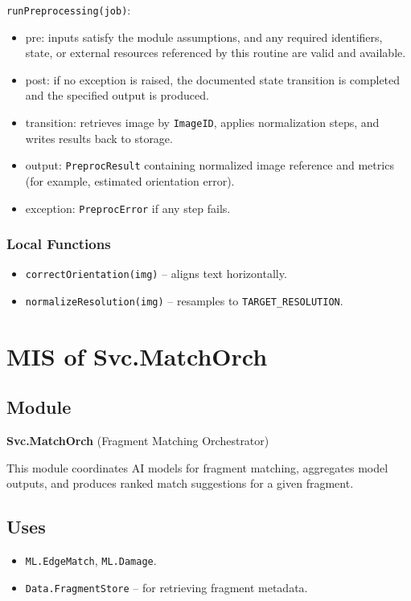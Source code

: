 \documentclass[12pt, titlepage]{article}
\begin{document}
\noindent \texttt{runPreprocessing(job)}:
\begin{itemize}
    \item pre: inputs satisfy the module assumptions, and any required identifiers, state, or external resources referenced by this routine are valid and available.
    \item post: if no exception is raised, the documented state transition is completed and the specified output is produced.
    \item transition: retrieves image by \texttt{ImageID}, applies normalization steps, and writes results back to storage.
    \item output: \texttt{PreprocResult} containing normalized image reference and metrics (for example, estimated orientation error).
    \item exception: \texttt{PreprocError} if any step fails.
\end{itemize}

\subsubsection{Local Functions}
\begin{itemize}
    \item \texttt{correctOrientation(img)} – aligns text horizontally.
    \item \texttt{normalizeResolution(img)} – resamples to \texttt{TARGET\_RESOLUTION}.
\end{itemize}



\section{MIS of Svc.MatchOrch} \label{Svc.MatchOrch}

\subsection{Module}
\textbf{Svc.MatchOrch} \; (Fragment Matching Orchestrator)

This module coordinates AI models for fragment matching, aggregates model outputs, and produces ranked match suggestions for a given fragment.

\subsection{Uses}
\begin{itemize}
    \item \texttt{ML.EdgeMatch}, \texttt{ML.Damage}.
    \item \texttt{Data.FragmentStore} – for retrieving fragment metadata.
\end{itemize}
\end{document}

